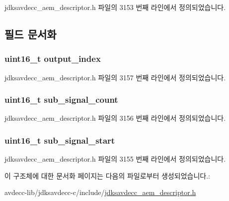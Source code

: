 jdksavdecc\+\_\+aem\+\_\+descriptor.\+h 파일의 3153 번째 라인에서 정의되었습니다.



\subsection{필드 문서화}
\subsubsection[{\texorpdfstring{output\+\_\+index}{output_index}}]{\setlength{\rightskip}{0pt plus 5cm}uint16\+\_\+t output\+\_\+index}\hypertarget{structjdksavdecc__demultiplexer__map_a894cb1dd2c8dab6ee5d8e165370fa0a7}{}\label{structjdksavdecc__demultiplexer__map_a894cb1dd2c8dab6ee5d8e165370fa0a7}


jdksavdecc\+\_\+aem\+\_\+descriptor.\+h 파일의 3157 번째 라인에서 정의되었습니다.

\subsubsection[{\texorpdfstring{sub\+\_\+signal\+\_\+count}{sub_signal_count}}]{\setlength{\rightskip}{0pt plus 5cm}uint16\+\_\+t sub\+\_\+signal\+\_\+count}\hypertarget{structjdksavdecc__demultiplexer__map_a539ba5ac909f01c2b76e345233d20902}{}\label{structjdksavdecc__demultiplexer__map_a539ba5ac909f01c2b76e345233d20902}


jdksavdecc\+\_\+aem\+\_\+descriptor.\+h 파일의 3156 번째 라인에서 정의되었습니다.

\subsubsection[{\texorpdfstring{sub\+\_\+signal\+\_\+start}{sub_signal_start}}]{\setlength{\rightskip}{0pt plus 5cm}uint16\+\_\+t sub\+\_\+signal\+\_\+start}\hypertarget{structjdksavdecc__demultiplexer__map_a4277ab8f00d35ea7381d919a79324a2f}{}\label{structjdksavdecc__demultiplexer__map_a4277ab8f00d35ea7381d919a79324a2f}


jdksavdecc\+\_\+aem\+\_\+descriptor.\+h 파일의 3155 번째 라인에서 정의되었습니다.



이 구조체에 대한 문서화 페이지는 다음의 파일로부터 생성되었습니다.\+:\begin{DoxyCompactItemize}
\item 
avdecc-\/lib/jdksavdecc-\/c/include/\hyperlink{jdksavdecc__aem__descriptor_8h}{jdksavdecc\+\_\+aem\+\_\+descriptor.\+h}\end{DoxyCompactItemize}
